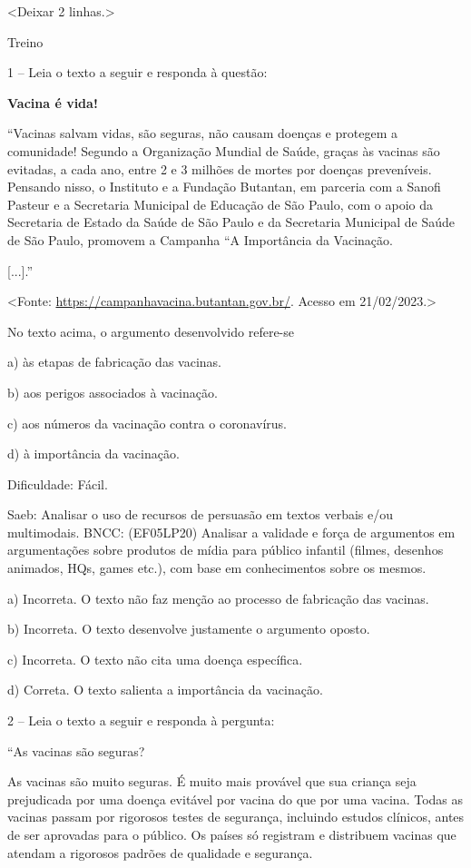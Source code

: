 \textless{}Deixar 2 linhas.\textgreater{}

Treino

1 -- Leia o texto a seguir e responda à questão:

\textbf{Vacina é vida!}

``Vacinas salvam vidas, são seguras, não causam doenças e protegem a
comunidade! Segundo a Organização Mundial de Saúde, graças às vacinas
são evitadas, a cada ano, entre 2 e 3 milhões de mortes por doenças
preveníveis. Pensando nisso, o Instituto e a Fundação Butantan, em
parceria com a Sanofi Pasteur e a Secretaria Municipal de Educação de
São Paulo, com o apoio da Secretaria de Estado da Saúde de São Paulo e
da Secretaria Municipal de Saúde de São Paulo, promovem a Campanha ``A
Importância da Vacinação.

{[}...{]}.''

\textless{}Fonte: \url{https://campanhavacina.butantan.gov.br/}. Acesso
em 21/02/2023.\textgreater{}

No texto acima, o argumento desenvolvido refere-se

a) às etapas de fabricação das vacinas.

b) aos perigos associados à vacinação.

c) aos números da vacinação contra o coronavírus.

d) à importância da vacinação.

Dificuldade: Fácil.

Saeb: Analisar o uso de recursos de persuasão em textos verbais e/ou
multimodais. BNCC: (EF05LP20) Analisar a validade e força de argumentos
em argumentações sobre produtos de mídia para público infantil (filmes,
desenhos animados, HQs, games etc.), com base em conhecimentos sobre os
mesmos.

a) Incorreta. O texto não faz menção ao processo de fabricação das
vacinas.

b) Incorreta. O texto desenvolve justamente o argumento oposto.

c) Incorreta. O texto não cita uma doença específica.

d) Correta. O texto salienta a importância da vacinação.

2 -- Leia o texto a seguir e responda à pergunta:

``As vacinas são seguras?

As vacinas são muito seguras. É muito mais provável que sua criança seja
prejudicada por uma doença evitável por vacina do que por uma vacina.
Todas as vacinas passam por rigorosos testes de segurança, incluindo
estudos clínicos, antes de ser aprovadas para o público. Os países só
registram e distribuem vacinas que atendam a rigorosos padrões de
qualidade e segurança.

